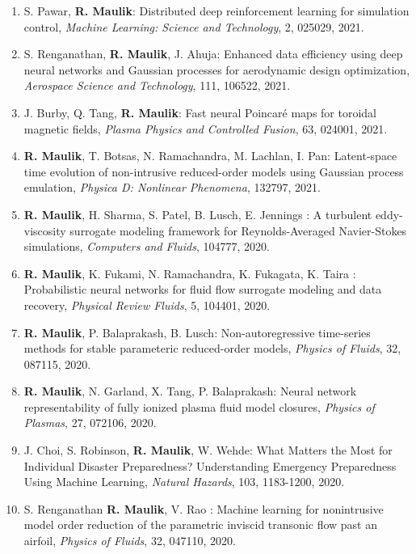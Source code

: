 \documentclass[letterpaper]{article}
\begin{document}
\begin{enumerate}
\item S. Pawar, \textbf{R. Maulik}: Distributed deep reinforcement learning for simulation control, {\it Machine Learning: Science and Technology}, 2, 025029, 2021.

\item S. Renganathan, \textbf{R. Maulik}, J. Ahuja: Enhanced data efficiency using deep neural networks and Gaussian processes for aerodynamic design optimization, {\it Aerospace Science and Technology}, 111, 106522, 2021.

\item J. Burby, Q. Tang, \textbf{R. Maulik}: Fast neural Poincar\'{e} maps for toroidal magnetic fields, {\it Plasma Physics and Controlled Fusion}, 63, 024001, 2021.

\item \textbf{R. Maulik}, T. Botsas, N. Ramachandra, M. Lachlan, I. Pan: Latent-space time evolution of non-intrusive reduced-order models using Gaussian process emulation, {\it Physica D: Nonlinear Phenomena}, 132797, 2021. 

\item \textbf{R. Maulik}, H. Sharma, S. Patel, B. Lusch, E. Jennings : A turbulent eddy-viscosity surrogate modeling framework for Reynolds-Averaged Navier-Stokes simulations, {\it Computers and Fluids}, 104777, 2020. 

\item \textbf{R. Maulik}, K. Fukami, N. Ramachandra, K. Fukagata, K. Taira : Probabilistic neural networks for fluid flow surrogate modeling and data recovery, {\it Physical Review Fluids}, 5, 104401, 2020. 

\item \textbf{R. Maulik}, P. Balaprakash, B. Lusch: Non-autoregressive time-series methods for stable parameteric reduced-order models, {\it Physics of Fluids}, 32, 087115, 2020.

\item \textbf{R. Maulik}, N. Garland, X. Tang, P. Balaprakash: Neural network representability of fully ionized plasma fluid model closures, {\it Physics of Plasmas}, 27, 072106, 2020.

\item J. Choi, S. Robinson, \textbf{R. Maulik}, W. Wehde: What Matters the Most for Individual Disaster Preparedness? Understanding Emergency Preparedness Using Machine Learning, {\it Natural Hazards}, 103, 1183-1200, 2020. 

\item S. Renganathan \textbf{R. Maulik}, V. Rao : Machine learning for nonintrusive model order reduction of the parametric inviscid transonic flow past an airfoil, {\it Physics of Fluids}, 32, 047110, 2020. 


\end{enumerate}
\end{document}

